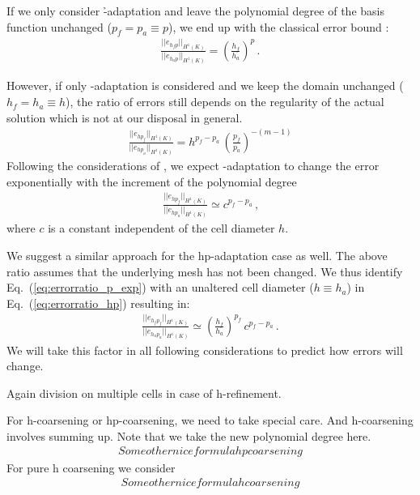 If we only consider \h-adaptation and leave the polynomial degree of the basis function unchanged ($p_f = p_a \equiv p$), we end up with the classical error bound :
\begin{align}
\label{eq:errorratio_h} \frac{||e_{h_f p}||_{H^{1}(K)}}{||e_{h_a p}||_{H^{1}(K)}} = \left( \frac{h_f}{h_a} \right)^p \,\text{.}
\end{align}

However, if only \p-adaptation is considered and we keep the domain unchanged ($h_f = h_a \equiv h$), the ratio of errors still depends on the regularity of the actual solution which is not at our disposal in general.
\begin{align}
\label{eq:errorratio_p} \frac{||e_{h p_f}||_{H^{1}(K)}}{||e_{h p_a}||_{H^{1}(K)}} = h^{p_f - p_a} \, \left(\frac{p_f}{p_a}\right)^{-(m-1)}
\end{align}
Following the considerations of \cite{melenk2001}, we expect \p-adaptation to change the error exponentially with the increment of the polynomial degree
\begin{align}
\label{eq:errorratio_p_exp} \frac{||e_{h p_f}||_{H^{1}(K)}}{||e_{h p_a}||_{H^{1}(K)}} \simeq c^{p_f - p_a} \,\text{,}
\end{align}
where $c$ is a constant independent of the cell diameter $h$.

We suggest a similar approach for the hp-adaptation case as well. The above ratio assumes that the underlying mesh has not been changed. We thus identify Eq.~(\ref{eq:errorratio_p_exp}) with an unaltered cell diameter ($h \equiv h_a$) in Eq.~(\ref{eq:errorratio_hp}) resulting in:
\begin{align}
\label{eq:errorratio_hp_exp} \frac{||e_{h_f p_f}||_{H^{1}(K)}}{||e_{h_a p_a}||_{H^{1}(K)}} \simeq \left( \frac{h_f}{h_a} \right)^{p_f} \, c^{p_f - p_a} \,\text{.}
\end{align}
We will take this factor in all following considerations to predict how errors will change.


Again division on multiple cells in case of h-refinement.

For h-coarsening or hp-coarsening, we need to take special care. And h-coarsening involves summing up. Note that we take the new polynomial degree here.
\begin{align}
Some other nice formula hp coarsening
\end{align}
For pure h coarsening we consider
\begin{align}
Some other nice formula h coarsening
\end{align}

